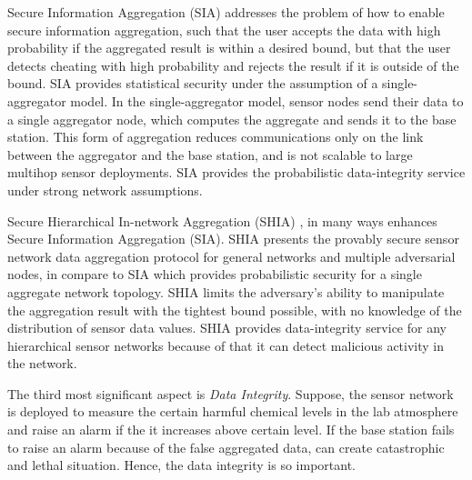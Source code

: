 	Secure Information Aggregation (SIA) \cite{przydatek2003sia}  addresses the problem of how to enable secure information aggregation, such that the user accepts the data with high probability if the aggregated result is within a desired bound, but that the user detects cheating with high probability and rejects the result if it is outside of the bound.
	SIA provides statistical security under the assumption of a single-aggregator model.
	In the single-aggregator model, sensor nodes send their data to a single
	aggregator node, which computes the aggregate and sends it to the
	base station.
	This form of aggregation reduces communications only on the link between the aggregator and the base station, and is not scalable to large multihop sensor deployments.
	SIA provides the probabilistic data-integrity service under strong network assumptions.

	Secure Hierarchical In-network Aggregation (SHIA) \cite{chan2006secure}, in many ways enhances Secure Information Aggregation (SIA).
	SHIA presents the provably secure sensor network data aggregation protocol for general networks and multiple adversarial nodes, in compare to SIA which provides probabilistic security for a single aggregate network topology.
	SHIA limits the adversary’s ability to manipulate the aggregation result with the tightest bound possible, with no knowledge of the distribution of sensor data values.
	SHIA provides data-integrity service for any hierarchical sensor networks because of that it can detect malicious activity in the network.

	The third most significant aspect is \textit{Data Integrity}.
	Suppose, the sensor network is deployed to measure the certain harmful chemical levels in the lab atmosphere and raise an alarm if the it increases above certain level.
	If the base station fails to raise an alarm because of the false aggregated data, can create catastrophic and lethal situation.
	Hence, the data integrity is so important.
	
